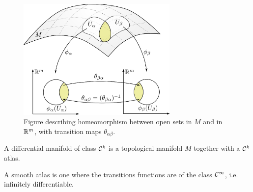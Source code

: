 \begin{figure}[H]
	\centering
	\centerline{\includegraphics[width=0.7\textwidth]{Figures/diffhomeoreal.eps}}
	\caption{Figure describing homeomorphism between open sets in $M$ and in $\mathbb R^m$, with transition maps $\theta_{\alpha\beta}$.}
\end{figure}

\begin{definition}[Provisional]
	A differential manifold of class $\mathcal{C}^k$ is a topological manifold $M$ together with a $\mathcal{C}^k$ atlas.
\end{definition}

\begin{remark}[Smoothness]
	A smooth atlas is one where the transitions functions are of the class $\mathcal{C}^\infty$, i.e. infinitely differentiable.
\end{remark}

